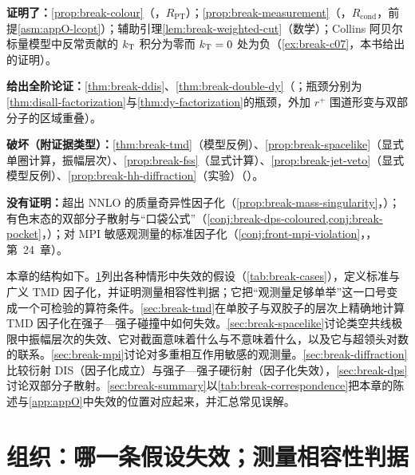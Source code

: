 \begin{tcolorbox}[enhanced,breakable,title=本章证明了什么／没有证明什么,fonttitle=\bfseries,
  colback=gray!3!white,colframe=gray!55!black,boxrule=0.6pt,arc=2pt,
  left=5pt,right=5pt,top=3pt,bottom=3pt,before skip=6pt,after skip=6pt]
\textbf{证明了：}\cref{prop:break-colour}（\tagR，$R_{\mathrm{PT}}$）；\cref{prop:break-measurement}（\tagR，$R_{\mathrm{cond}}$，前提\cref{asm:appO-lcopt}）；辅助引理\cref{lem:break-weighted-cut}（数学）；Collins 阿贝尔标量模型中反常贡献的 $k_{\mathrm{T}}$ 积分为零而 $k_{\mathrm{T}}=0$ 处为负（\cref{ex:break-c07}，本书给出的证明）。\par
\textbf{给出全阶论证：}\cref{thm:break-ddis}、\cref{thm:break-double-dy}（\tagA；瓶颈分别为\cref{thm:disall-factorization}与\cref{thm:dy-factorization}的瓶颈，外加 $r^+$ 围道形变与双部分子的区域重叠）。\par
\textbf{破坏（附证据类型）：}\cref{thm:break-tmd}（模型反例）、\cref{prop:break-spacelike}（显式单圈计算，振幅层次）、\cref{prop:break-fss}（显式计算）、\cref{prop:break-jet-veto}（显式模型反例）、\cref{prop:break-hh-diffraction}（实验）（\tagV）。\par
\textbf{没有证明：}超出 NNLO 的质量奇异性因子化（\cref{prop:break-mass-singularity}，\tagC）；有色末态的双部分子散射与“口袋公式”（\cref{conj:break-dps-coloured,conj:break-pocket}，\tagC）；对 MPI 敏感观测量的标准因子化（\cref{conj:front-mpi-violation}，\tagC，第~24~章）。
\end{tcolorbox}

本章的结构如下。\cref{sec:break-overview}列出各种情形中失效的假设（\cref{tab:break-cases}），定义标准与广义 TMD 因子化，并证明测量相容性判据；它把“观测量足够单举”这一口号变成一个可检验的算符条件。\cref{sec:break-tmd}在单胶子与双胶子的层次上精确地计算 TMD 因子化在强子—强子碰撞中如何失效。\cref{sec:break-spacelike}讨论类空共线极限中振幅层次的失效、它对截面意味着什么与不意味着什么，以及它与超领头对数的联系。\cref{sec:break-mpi}讨论对多重相互作用敏感的观测量。\cref{sec:break-diffraction}比较衍射 DIS（因子化成立）与强子—强子硬衍射（因子化失效），\cref{sec:break-dps}讨论双部分子散射。\cref{sec:break-summary}以\cref{tab:break-correspondence}把本章的陈述与\cref{app:appO}中失效的位置对应起来，并汇总常见误解。
\section{组织：哪一条假设失效；测量相容性判据}\label{sec:break-overview}

